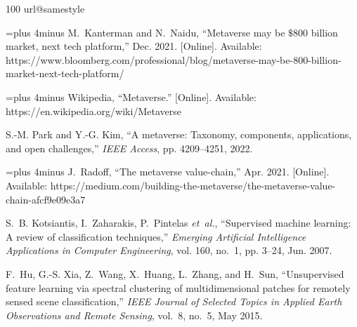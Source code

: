 \documentclass[journal]{IEEEtran}
\begin{document}
\balance
\begin{thebibliography}{100}
	\providecommand{\url}[1]{#1}
	\csname url@samestyle\endcsname
	\providecommand{\newblock}{\relax}
	\providecommand{\bibinfo}[2]{#2}
	\providecommand{\BIBentrySTDinterwordspacing}{\spaceskip=0pt\relax}
	\providecommand{\BIBentryALTinterwordstretchfactor}{4}
	\providecommand{\BIBentryALTinterwordspacing}{\spaceskip=\fontdimen2\font plus
		\BIBentryALTinterwordstretchfactor\fontdimen3\font minus
		\fontdimen4\font\relax}
	\providecommand{\BIBforeignlanguage}[2]{{%
			\expandafter\ifx\csname l@#1\endcsname\relax
			\typeout{** WARNING: IEEEtran.bst: No hyphenation pattern has been}%
			\typeout{** loaded for the language `#1'. Using the pattern for}%
			\typeout{** the default language instead.}%
			\else
			\language=\csname l@#1\endcsname
			\fi
			#2}}
	\providecommand{\BIBdecl}{\relax}
	\BIBdecl
	
	\BIBentryALTinterwordspacing
	M.~Kanterman and N.~Naidu, ``Metaverse may be $\$800$ billion market, next tech
	platform,'' Dec. 2021. [Online]. Available:
	\url{https://www.bloomberg.com/professional/blog/metaverse-may-be-800-billion-market-next-tech-platform/}
	\BIBentrySTDinterwordspacing
	
	\BIBentryALTinterwordspacing
	Wikipedia, ``Metaverse.'' [Online]. Available:
	\url{https://en.wikipedia.org/wiki/Metaverse}
	\BIBentrySTDinterwordspacing
	
	S.-M. Park and Y.-G. Kim, ``A metaverse: Taxonomy, components, applications,
	and open challenges,'' \emph{IEEE Access}, pp. 4209--4251, 2022.
	
	\BIBentryALTinterwordspacing
	J.~Radoff, ``The metaverse value-chain,'' Apr. 2021. [Online]. Available:
	\url{https://medium.com/building-the-metaverse/the-metaverse-value-chain-afcf9e09e3a7}
	\BIBentrySTDinterwordspacing
	
	S.~B. Kotsiantis, I.~Zaharakis, P.~Pintelas \emph{et~al.}, ``Supervised machine
	learning: A review of classification techniques,'' \emph{Emerging Artificial
		Intelligence Applications in Computer Engineering}, vol. 160, no.~1, pp.
	3--24, Jun. 2007.
	
	F.~Hu, G.-S. Xia, Z.~Wang, X.~Huang, L.~Zhang, and H.~Sun, ``Unsupervised
	feature learning via spectral clustering of multidimensional patches for
	remotely sensed scene classification,'' \emph{IEEE Journal of Selected Topics
		in Applied Earth Observations and Remote Sensing}, vol.~8, no.~5, May 2015.
	

\end{thebibliography}
\end{document}
